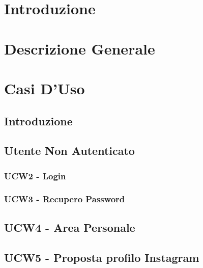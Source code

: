 \documentclass[a4paper]{article}
\begin{document}
		
	
		

	\renewcommand{\contentsname}{Indice}
	\tableofcontents	
	\listoffigures
	\listoftables
	\pagebreak
	
	\section{Introduzione}
	 	
	\newpage
	
	\section{Descrizione Generale}
	 	
	\newpage
	
	\section{Casi D'Uso}
	
	\subsection{Introduzione}
	
	
	\subsection{Utente Non Autenticato}
	
	
	\subsubsection{UCW2 - Login}
	
	
	\subsubsection{UCW3 - Recupero Password}
	
	
	\subsection{UCW4 - Area Personale}
	
	
	\subsection{UCW5 - Proposta profilo Instagram}
	
	
\end{document}
